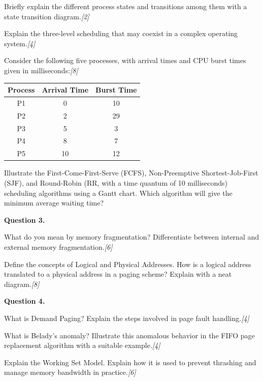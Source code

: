 \documentclass[11pt,a4paper]{article}
\newcommand{\pts}[1]{\hfill   \textit{[#1]}}
\begin{document}
\begin{parts}
  \item Briefly explain the different process states and transitions among them with a state transition diagram.\pts{2}
  \item Explain the three-level scheduling that may coexist in a complex operating system.\pts{4}
  \item Consider the following five processes, with arrival times and CPU burst times given in milliseconds:\pts{8}
  
\begin{center}
    
\begin{tabular}{|c|c|c|}
    \hline
   \textbf{Process} &   \textbf{Arrival Time} &   \textbf{Burst Time} \\
    \hline
    P1 & 0  & 10 \\
    P2 & 2  & 29 \\
    P3 & 5  & 3  \\
    P4 & 8  & 7  \\
    P5 & 10 & 12 \\
    \hline
    \end{tabular}
  \end{center}
  Illustrate the First-Come-First-Serve (FCFS), Non-Preemptive Shortest-Job-First (SJF), and Round-Robin (RR, with a time quantum of 10 milliseconds) scheduling algorithms using a Gantt chart. Which algorithm will give the minimum average waiting time?
\end{parts}

\medskip


\noindent   \textbf{Question 3.}

\begin{parts}
  \item What do you mean by memory fragmentation? Differentiate between internal and external memory fragmentation.\pts{6}
  \item Define the concepts of Logical and Physical Addresses. How is a logical address translated to a physical address in a paging scheme? Explain with a neat diagram.\pts{8}
\end{parts}

\medskip


\noindent   \textbf{Question 4.}

\begin{parts}
  \item What is Demand Paging? Explain the steps involved in page fault handling.\pts{4}
  \item What is Belady's anomaly? Illustrate this anomalous behavior in the FIFO page replacement algorithm with a suitable example.\pts{4}
  \item Explain the Working Set Model. Explain how it is used to prevent thrashing and manage memory bandwidth in practice.\pts{6}
\end{parts}
\end{document}

